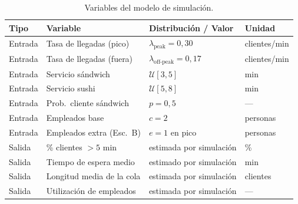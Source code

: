 \begin{table}[H]
  \centering
  \caption{Variables del modelo de simulación.}
  \label{tab:variables}
  \begin{tabular}{llll}
    \toprule
    \textbf{Tipo} & \textbf{Variable} & \textbf{Distribución / Valor} & \textbf{Unidad} \\
    \midrule
    Entrada & Tasa de llegadas (pico)     & $\lambda_{\text{peak}} = 0{,}30$      & clientes/min \\
    Entrada & Tasa de llegadas (fuera)    & $\lambda_{\text{off-peak}} = 0{,}17$  & clientes/min \\
    Entrada & Servicio sándwich           & $\mathcal{U}[3,5]$            & min \\
    Entrada & Servicio sushi              & $\mathcal{U}[5,8]$            & min \\
    Entrada & Prob.\ cliente sándwich     & $p = 0{,}5$                   & --- \\
    Entrada & Empleados base              & $c = 2$                       & personas \\
    Entrada & Empleados extra (Esc.\ B)   & $e = 1$ en pico               & personas \\
    \midrule
    Salida  & \% clientes $> 5$ min       & estimada por simulación       & \% \\
    Salida  & Tiempo de espera medio      & estimado por simulación       & min \\
    Salida  & Longitud media de la cola   & estimada por simulación       & clientes \\
    Salida  & Utilización de empleados    & estimada por simulación       & --- \\
    \bottomrule
  \end{tabular}
\end{table}
